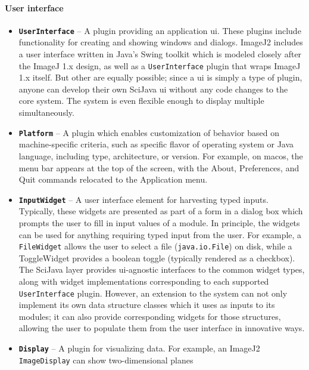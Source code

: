 \documentclass{bmcart}
\begin{document}
\paragraph*{User interface}
\begin{itemize}
  \item \textbf{\texttt{UserInterface}} -- A plugin providing an application
    \acrshort{ui}. These plugins include functionality for creating and showing
    windows and dialogs. ImageJ2 includes a user interface written in Java's
    Swing toolkit which is modeled closely after the ImageJ 1.x design, as well
    as a \texttt{UserInterface} plugin that wraps ImageJ 1.x itself. But other
     are equally possible; since a \acrshort{ui} is simply a
    type of plugin, anyone can develop their own SciJava \acrshort{ui} without
    any code changes to the core system. The system is even flexible enough to
    display multiple  simultaneously.
  \item \textbf{\texttt{Platform}} -- A plugin which enables customization of
    behavior based on machine-specific criteria, such as specific flavor of
    operating system or Java language, including type, architecture, or
    version. For example, on \acrshort{macos}, the menu bar appears at the top
    of the screen, with the About, Preferences, and Quit commands relocated to
    the Application menu.
  \item \textbf{\texttt{InputWidget}} -- A user interface element for
    harvesting typed inputs. Typically, these widgets are presented as part of
    a form in a dialog box which prompts the user to fill in input values of a
    module. In principle, the widgets can be used for anything requiring typed
    input from the user. For example, a \texttt{FileWidget} allows the user to
    select a file (\texttt{java.io.File}) on disk, while a ToggleWidget
    provides a boolean toggle (typically rendered as a checkbox). The SciJava
    layer provides \acrshort{ui}-agnostic interfaces to the common widget
    types, along with widget implementations corresponding to each supported
    \texttt{UserInterface} plugin. However, an extension to the system can not
    only implement its own data structure classes which it uses as inputs to
    its modules; it can also provide corresponding widgets for those
    structures, allowing the user to populate them from the user interface in
    innovative ways.
  \item \textbf{\texttt{Display}} -- A plugin for visualizing data. For
    example, an ImageJ2 \texttt{ImageDisplay} can show two-dimensional planes

\end{itemize}
\end{document}
